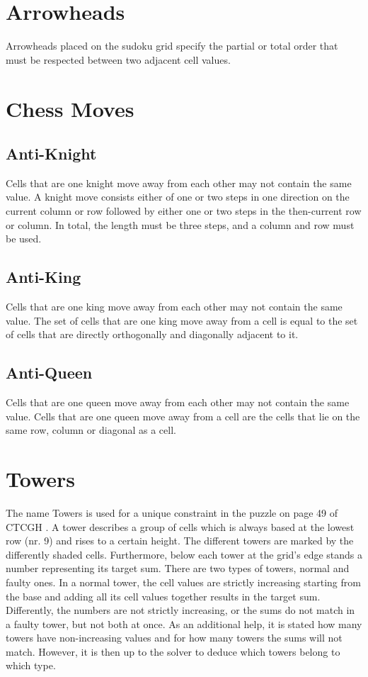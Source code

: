 \section{Arrowheads}
Arrowheads placed on the sudoku grid specify the partial or total order that must be respected between two adjacent cell values.

\section{Chess Moves}

\subsection{Anti-Knight}
Cells that are one knight move away from each other may not contain the same value. A knight move consists either of one or two steps in one direction on the current column or row followed by either one or two steps in the then-current row or column. In total, the length must be three steps, and a column and row must be used.

\subsection{Anti-King}
Cells that are one king move away from each other may not contain the same value. The set of cells that are one king move away from a cell is equal to the set of cells that are directly orthogonally and diagonally adjacent to it.

\subsection{Anti-Queen}
Cells that are one queen move away from each other may not contain the same value. Cells that are one queen move away from a cell are the cells that lie on the same row, column or diagonal as a cell.

\section{Towers}
The name Towers is used for a unique constraint in the puzzle on page 49 of CTCGH \cite{CrackingTheCryptic2021}. A tower describes a group of cells which is always based at the lowest row (nr. 9) and rises to a certain height. The different towers are marked by the differently shaded cells. Furthermore, below each tower at the grid's edge stands a number representing its target sum. There are two types of towers, normal and faulty ones. In a normal tower, the cell values are strictly increasing starting from the base and adding all its cell values together results in the target sum. Differently, the numbers are not strictly increasing, or the sums do not match in a faulty tower, but not both at once. As an additional help, it is stated how many towers have non-increasing values and for how many towers the sums will not match. However, it is then up to the solver to deduce which towers belong to which type.